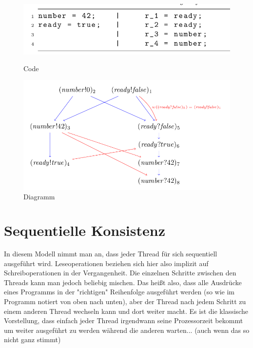 \documentclass[a4paper,10pt, oneside]{book}
\begin{document}
\begin{figure}[htb]
	
	\begin{minipage}[t]{0.3\linewidth}
		\centering
		\includegraphics[scale=0.3]{KompCode}
		\caption{Code}
	\end{minipage}
	\hfill
	\begin{minipage}[t]{0.6\linewidth}
		\centering
		\includegraphics[scale=0.3]{KompDia}
		\caption{Diagramm}
		\end{minipage}
\end{figure}

\section{Sequentielle Konsistenz}
In diesem Modell nimmt man an, dass jeder Thread für sich sequentiell ausgeführt wird. Leseoperationen beziehen sich hier also implizit auf Schreiboperationen in der Vergangenheit. Die einzelnen Schritte zwischen den Threads kann man jedoch beliebig mischen. Das heißt also, dass alle Ausdrücke eines Programms in der "richtigen" Reihenfolge ausgeführt werden (so wie im Programm notiert von oben nach unten), aber der Thread nach jedem Schritt zu einem anderen Thread wechseln kann und dort weiter macht. Es ist die klassische Vorstellung, dass einfach jeder Thread irgendwann seine Prozessorzeit bekommt um weiter ausgeführt zu werden während die anderen warten... (auch wenn das so nicht ganz stimmt)
\pagebreak
\end{document}
